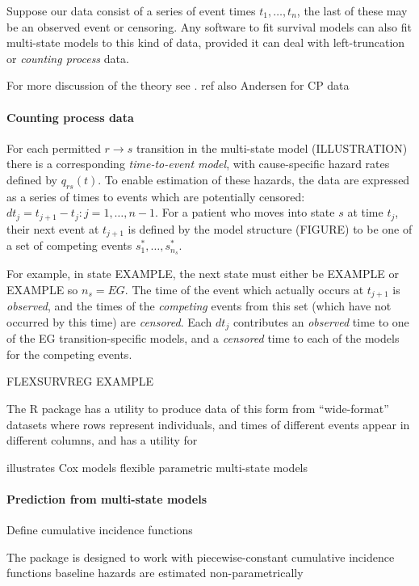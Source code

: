 \documentclass[nojss,nofooter]{jss}
\begin{document}
Suppose our data consist of a series of event times $t_{1},\dots,
t_{n}$, the last of these may be an observed event or censoring.  Any
software to fit survival models can also fit multi-state models to
this kind of data, provided it can deal with left-truncation or
\emph{counting process} data.

For more discussion of the theory see \citet{putter:mstate}. ref also
Andersen for CP data

\paragraph{Counting process data}
For each permitted $r \rightarrow s$ transition in the multi-state
model (ILLUSTRATION) there is a corresponding \emph{time-to-event
  model}, with cause-specific hazard rates defined by $q_{rs}(t)$. To
enable estimation of these hazards, the data are expressed as a series
of times to events which are potentially censored: $dt_{j} = t_{j+1} -
t_{j}: j = 1,\ldots,n-1$. For a patient who moves into state $s$ at
time $t_{j}$, their next event at $t_{j+1}$ is defined by the model
structure (FIGURE) to be one of a set of
competing events $s^*_1,\ldots,s^*_{n_s}$.

For example, in state EXAMPLE, the next state must either be EXAMPLE
or EXAMPLE so $n_s=EG$.  The time of the event which actually occurs
at $t_{j+1}$ is \emph{observed}, and the times of the \emph{competing}
events from this set (which have not occurred by this time) are
\emph{censored}.  Each $dt_{j}$ contributes an \emph{observed} time to
one of the EG transition-specific models, and a \emph{censored} time
to each of the models for the competing events.

FLEXSURVREG EXAMPLE

The  R package \citep{mstate:cmpb,mstate:jss} has a
utility  to produce data of this form from
``wide-format'' datasets where rows represent individuals, and times
of different events appear in different columns, and  has
a utility  for 

illustrates Cox models
flexible parametric multi-state models 

\paragraph{Prediction from multi-state models}

Define cumulative incidence functions

The  package is designed to work with 
piecewise-constant cumulative incidence functions
baseline hazards are estimated non-parametrically 
\citep{mstate:cmpb,mstate:jss} 
\end{document}
